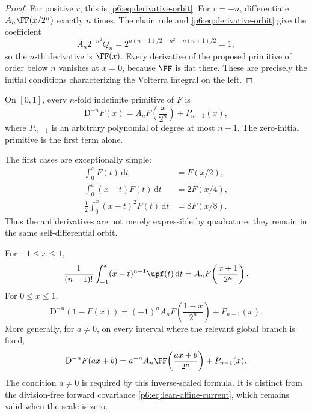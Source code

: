 \documentclass[11pt,oneside]{article}
\theoremstyle{definition}
\theoremstyle{remark}
\newcommand{\dd}{\,\mathrm d}
\newcommand{\1}{\mathbf 1}
\begin{document}
\begin{proof}
For positive \(r\), this is \eqref{p6:eq:derivative-orbit}.  For \(r=-n\), differentiate
\(A_n\FF(x/2^n)\) exactly \(n\) times.  The chain rule and
\eqref{p6:eq:derivative-orbit} give the coefficient
\[
 A_n2^{-n^2}Q_n
 =2^{n(n-1)/2-n^2+n(n+1)/2}=1,
\]
so the \(n\)-th derivative is \(\FF(x)\).  Every derivative of the proposed primitive
of order below \(n\) vanishes at \(x=0\), because \(\FF\) is flat there.  These are
precisely the initial conditions characterizing the Volterra integral on the left.
\end{proof}

\begin{corollary}
\label{p6:cor:F-primitives}
On \([0,1]\), every \(n\)-fold indefinite primitive of \(F\) is
\begin{equation}
 \mathrm D^{-n}F(x)=A_nF\!\left(\frac{x}{2^n}\right)+P_{n-1}(x), \label{p6:eq:F-nprimitive}
\end{equation}
where \(P_{n-1}\) is an arbitrary polynomial of degree at most \(n-1\).  The
zero-initial primitive is the first term alone.
\end{corollary}

The first cases are exceptionally simple:
\begin{align}
 \int_0^xF(t)\dd t&=F(x/2),                                      \label{p6:eq:F-first-primitive}\\
 \int_0^x(x-t)F(t)\dd t&=2F(x/4),                                \\
 \frac12\int_0^x(x-t)^2F(t)\dd t&=8F(x/8).
\end{align}
Thus the antiderivatives are not merely expressible by quadrature: they remain in the
same self-differential orbit.

\begin{corollary}
\label{p6:cor:other-primitives}
For \(-1\le x\le1\),
\begin{equation}
 \frac1{(n-1)!}\int_{-1}^x(x-t)^{n-1}\upf(t)\dd t
 =A_nF\!\left(\frac{x+1}{2^n}\right).                    \label{p6:eq:up-local-primitive}
\end{equation}
For \(0\le x\le1\),
\begin{equation}
 \mathrm D^{-n}(1-F(x))
 =(-1)^nA_nF\!\left(\frac{1-x}{2^n}\right)+P_{n-1}(x).   \label{p6:eq:one-minus-F}
\end{equation}
More generally, for \(a\ne0\), on every interval where the relevant global branch is fixed,
\begin{equation}
 \mathrm D^{-n}F(ax+b)
 =a^{-n}A_n\FF\!\left(\frac{ax+b}{2^n}\right)+P_{n-1}(x). \label{p6:eq:affine-primitive}
\end{equation}
The condition \(a\ne0\) is required by this inverse-scaled formula.  It is distinct from the
division-free forward covariance \eqref{p6:eq:lean-affine-current}, which remains valid when the
scale is zero.
\end{corollary}
\end{document}
